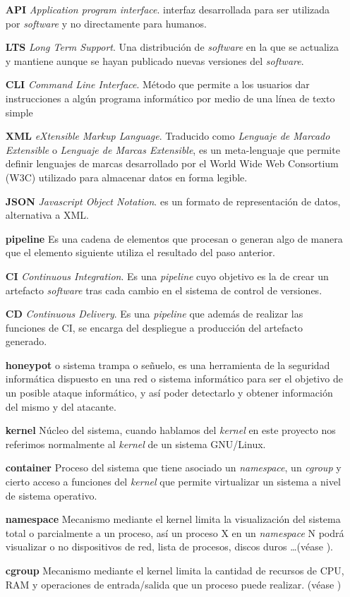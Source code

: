 \begin{itemize}
    \item[\textbf{API}] \emph{Application program interface}. interfaz desarrollada para ser utilizada por \emph{software} y no directamente para humanos.
    \item[\textbf{LTS}] \emph{Long Term Support}. Una distribución de \emph{software} en la que se actualiza y mantiene aunque se hayan publicado nuevas versiones del \emph{software}.
    \item[\textbf{CLI}] \emph{Command Line Interface}. Método que permite a los usuarios dar instrucciones a algún programa informático por medio de una línea de texto simple
    \item[\textbf{XML}] \emph{eXtensible Markup Language}. Traducido como \emph{Lenguaje de Marcado Extensible} o \emph{Lenguaje de Marcas Extensible}, es un meta-lenguaje que permite definir lenguajes de marcas desarrollado por el World Wide Web Consortium (W3C) utilizado para almacenar datos en forma legible.
    \item[\textbf{JSON}] \emph{Javascript Object Notation}. es un formato de representación de datos, alternativa a XML.
    \item[\textbf{pipeline}] Es una cadena de elementos que procesan o generan algo de manera que el elemento siguiente utiliza el resultado del paso anterior.
    \item[\textbf{CI}] \emph{Continuous Integration}. Es una \emph{pipeline} cuyo objetivo es la de crear un artefacto \emph{software} tras cada cambio en el sistema de control de versiones.
    \item[\textbf{CD}] \emph{Continuous Delivery}. Es una \emph{pipeline} que además de realizar las funciones de CI, se encarga del despliegue a producción del artefacto generado. 
    \item[\textbf{honeypot}] o sistema trampa o señuelo, es una herramienta de la seguridad informática dispuesto en una red o sistema informático para ser el objetivo de un posible ataque informático, y así poder detectarlo y obtener información del mismo y del atacante.
    \item[\textbf{kernel}] Núcleo del sistema, cuando hablamos del \emph{kernel} en este proyecto nos referimos normalmente al \emph{kernel} de un sistema GNU/Linux. 
    \item[\textbf{container}] Proceso del sistema que tiene asociado un \emph{namespace}, un \emph{cgroup} y cierto acceso a funciones del \emph{kernel} que permite virtualizar un sistema a nivel de sistema operativo. 
    \item[\textbf{namespace}] Mecanismo mediante el kernel limita la visualización del sistema total o parcialmente a un proceso, así un proceso X en un \emph{namespace} N podrá visualizar o no
    dispositivos de red, lista de procesos, discos duros \ldots (véase \cite{wiki-namespaces}).
    \item[\textbf{cgroup}] Mecanismo mediante el kernel limita la cantidad de recursos de CPU, RAM y operaciones de entrada/salida que un proceso puede realizar. (véase \cite{wiki-cgroups})
\end{itemize}




    



